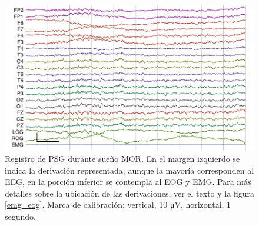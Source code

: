 \documentclass[12pt,letterpaper]{book}
\newcommand{\mv}{\si{\micro\volt}\xspace}
\begin{document}
\begin{figure}
\centering
\includegraphics[width=\linewidth]
{./img_ejemplos/MJNN_epoca_stam.pdf}
\caption[Registro de polisomnograma durante sueño MOR]
{Registro de PSG durante sueño MOR. En el margen izquierdo se indica la derivación representada; aunque la mayoría corresponden al EEG, en la porción inferior se contempla al EOG y EMG.
Para más detalles sobre la ubicación de las derivaciones, ver el texto y la figura \ref{emg_eog}. Marca de calibración: vertical, 10 \mv, horizontal, 1 segundo.}
\label{ejemplos_mor}
\end{figure}

\end{document}
